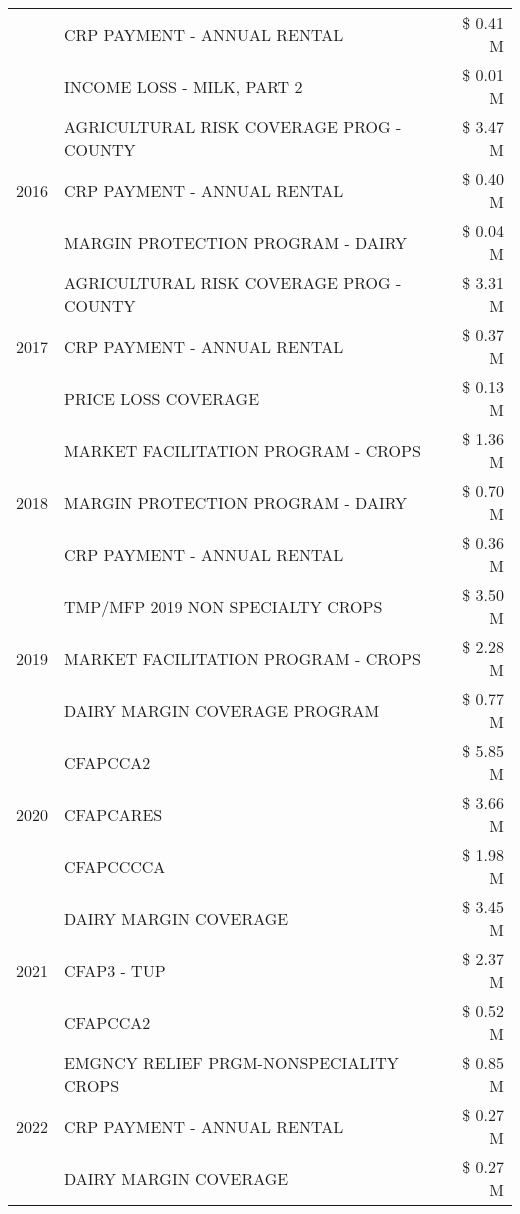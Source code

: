 \begin{tabular}{llr}
 & CRP PAYMENT - ANNUAL RENTAL & \$ 0.41 M \\
 & INCOME LOSS - MILK, PART 2 & \$ 0.01 M \\
\cline{1-3}
\multirow[t]{3}{*}{2016} & AGRICULTURAL RISK COVERAGE PROG - COUNTY & \$ 3.47 M \\
 & CRP PAYMENT - ANNUAL RENTAL & \$ 0.40 M \\
 & MARGIN PROTECTION PROGRAM - DAIRY & \$ 0.04 M \\
\cline{1-3}
\multirow[t]{3}{*}{2017} & AGRICULTURAL RISK COVERAGE PROG - COUNTY & \$ 3.31 M \\
 & CRP PAYMENT - ANNUAL RENTAL & \$ 0.37 M \\
 & PRICE LOSS COVERAGE & \$ 0.13 M \\
\cline{1-3}
\multirow[t]{3}{*}{2018} & MARKET FACILITATION PROGRAM - CROPS & \$ 1.36 M \\
 & MARGIN PROTECTION PROGRAM - DAIRY & \$ 0.70 M \\
 & CRP PAYMENT - ANNUAL RENTAL & \$ 0.36 M \\
\cline{1-3}
\multirow[t]{3}{*}{2019} & TMP/MFP 2019 NON SPECIALTY CROPS & \$ 3.50 M \\
 & MARKET FACILITATION PROGRAM - CROPS & \$ 2.28 M \\
 & DAIRY MARGIN COVERAGE PROGRAM & \$ 0.77 M \\
\cline{1-3}
\multirow[t]{3}{*}{2020} & CFAPCCA2 & \$ 5.85 M \\
 & CFAPCARES & \$ 3.66 M \\
 & CFAPCCCCA & \$ 1.98 M \\
\cline{1-3}
\multirow[t]{3}{*}{2021} & DAIRY MARGIN COVERAGE & \$ 3.45 M \\
 & CFAP3 - TUP & \$ 2.37 M \\
 & CFAPCCA2 & \$ 0.52 M \\
\cline{1-3}
\multirow[t]{3}{*}{2022} & EMGNCY RELIEF PRGM-NONSPECIALITY CROPS & \$ 0.85 M \\
 & CRP PAYMENT - ANNUAL RENTAL & \$ 0.27 M \\
 & DAIRY MARGIN COVERAGE & \$ 0.27 M \\
\cline{1-3}
\bottomrule
\end{tabular}
